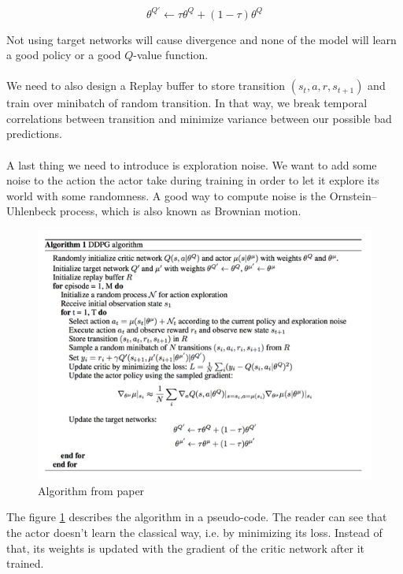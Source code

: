 \documentclass{article}
\begin{document}
\begin{equation}
\theta^{Q'} \leftarrow \tau\theta^Q + (1 - \tau)\theta^Q
\end{equation}

Not using target networks will cause divergence and none of the model will learn
a good policy or a good $Q$-value function.
\paragraph{}
We need to also design a Replay buffer to store transition $(s_t, a, r,
s_{t+1})$ and train over minibatch of random transition. In that way, we break
temporal correlations between transition and minimize variance between our
possible bad predictions.
\paragraph{}
A last thing we need to introduce is exploration noise. We want to add some noise to the
action the actor take during training in order to let it explore its world with
some randomness. A good way to compute noise is the Ornstein–Uhlenbeck process,
which is also known as Brownian motion. 

\begin{figure}[ht]
  \centering
  \includegraphics[width=\textwidth]{algoDDPG}
  \caption{Algorithm from \citeauthor{journals/corr/LillicrapHPHETS15} paper}
  \label{fig:algoDDPG}
\end{figure}

The figure \ref{fig:algoDDPG} describes the algorithm in a pseudo-code. The
reader can see that the actor doesn't learn the classical way, i.e. by
minimizing its loss. Instead of that, its weights is updated with the gradient
of the critic network after it trained. 
\end{document}
